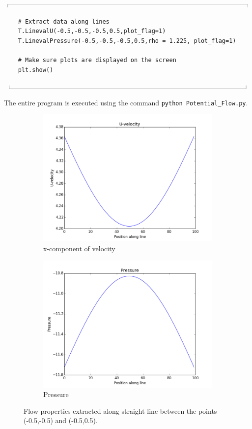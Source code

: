 \documentclass[10pt,a4paper]{article}
\newcommand{\topbar}{\ensuremath{
    \rule{0.1mm}{2.0mm} \rule[2.0mm]{159.5mm}{0.1mm} \rule{0.1mm}{2.0mm}
}}
\newcommand{\bottombar}{\ensuremath{
    \rule{0.1mm}{2.0mm} \rule{159.5mm}{0.1mm} \rule{0.1mm}{2.0mm}
}}
\begin{document}
\noindent
\topbar
\begin{lstlisting}
    # Extract data along lines
    T.LinevalU(-0.5,-0.5,-0.5,0.5,plot_flag=1)
    T.LinevalPressure(-0.5,-0.5,-0.5,0.5,rho = 1.225, plot_flag=1)

    # Make sure plots are displayed on the screen
    plt.show()
\end{lstlisting}
\bottombar

\noindent
The entire program is executed using the command \verb'python Potential_Flow.py'. 

\begin{figure}
\centering
\begin{subfigure}{0.48\textwidth}
    \includegraphics[width=1.0\textwidth]{Figures/U-velocity}
  \caption{x-component of velocity}
\end{subfigure}
\hfill
\begin{subfigure}{0.48\textwidth}
    \includegraphics[width=1.0\textwidth]{Figures/P-trace}
  \caption{Pressure}
\end{subfigure}
\caption{Flow properties extracted along straight line between the points (-0.5,-0.5) and (-0.5,0.5).}
\label{F_extract_test}
\end{figure}
\end{document}

